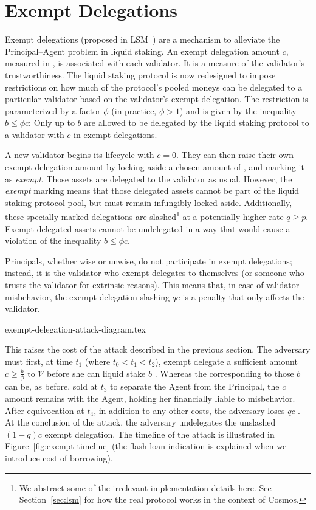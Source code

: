 \section{Exempt Delegations}

Exempt delegations (proposed in LSM~\cite{liquidity-staking-module})
are a mechanism to alleviate the Principal--Agent problem in liquid staking.
An exempt delegation amount $c$, measured in \asset, is associated
with each validator. It is a measure of the validator's trustworthiness.
The liquid staking protocol is now redesigned to impose restrictions
on how much of the protocol's pooled moneys can be delegated to a particular
validator based on the validator's exempt delegation.
The restriction is
parameterized by a factor $\phi$ (in practice, $\phi > 1$)
and is given by the inequality $b \leq \phi c$: Only up to $b$ \assets
are allowed to be delegated by the liquid staking protocol
to a validator with $c$ \assets in exempt delegations.

A new validator begins its lifecycle with $c = 0$. They can then
raise their own exempt delegation amount by locking aside a
chosen amount of \asset, and marking it as \emph{exempt}. Those
assets are delegated to the validator as usual. However,
the \emph{exempt}
marking means that those delegated assets cannot be part of the liquid
staking protocol pool, but must remain infungibly locked aside. Additionally,
these specially marked delegations are slashed\footnote{We abstract some
of the irrelevant implementation details here. See Section~\ref{sec:lsm}
for how the real protocol works in the context of Cosmos.}
at a potentially higher rate $q \geq p$. Exempt delegated assets cannot
be undelegated in a way that would cause a violation of the inequality
$b \leq \phi c$.

Principals, whether wise or unwise, do not participate in exempt
delegations; instead, it is the validator who exempt delegates to
themselves (or someone who trusts the validator for extrinsic reasons).
This means that, in case of validator misbehavior, the exempt delegation
slashing $qc$ is a penalty that only affects the validator.

{exempt-delegation-attack-diagram.tex}

This raises
the cost of the attack described in the previous section. The
adversary must first, at time $t_1$ (where $t_0 < t_1 < t_2$), exempt delegate a sufficient amount
$c \geq \frac{b}{\phi}$ \asset to $\mathcal{V}$ before she can liquid stake $b$ \asset.
Whereas the \stassets
corresponding to those $b$ \assets can be, as before, sold at $t_3$ to
separate the Agent from the Principal, the $c$ amount remains with the
Agent, holding her financially liable to misbehavior. After equivocation at $t_4$,
in addition to any other costs, the adversary loses $qc$ \asset. At the conclusion
of the attack, the adversary undelegates the unslashed $(1 - q)c$ exempt delegation.
The timeline of the attack is illustrated in Figure~\ref{fig:exempt-timeline}
(the flash loan indication is explained when we introduce cost of borrowing).

